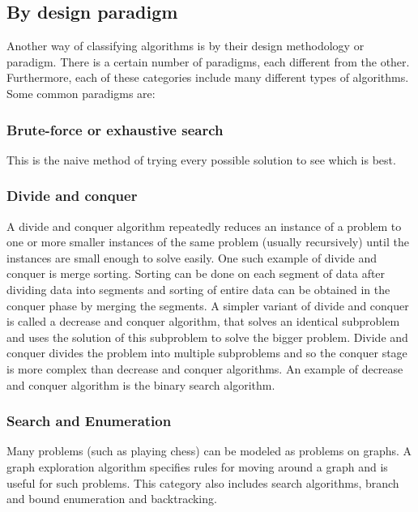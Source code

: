 \documentclass[12pt,a4paper]{book}
\begin{document}
\subsection{By design paradigm}
Another way of classifying algorithms is by their design methodology or paradigm. There is a certain number of paradigms, each different from the other. Furthermore, each of these categories include many different types of algorithms. Some common paradigms are:
\subsubsection{Brute-force or exhaustive search}
This is the naive method of trying every possible solution to see which is best.
\subsubsection{Divide and conquer}
A divide and conquer algorithm repeatedly reduces an instance of a problem to one or more smaller instances of the same problem (usually recursively) until the instances are small enough to solve easily. One such example of divide and conquer is merge sorting. Sorting can be done on each segment of data after dividing data into segments and sorting of entire data can be obtained in the conquer phase by merging the segments. A simpler variant of divide and conquer is called a decrease and conquer algorithm, that solves an identical subproblem and uses the solution of this subproblem to solve the bigger problem. Divide and conquer divides the problem into multiple subproblems and so the conquer stage is more complex than decrease and conquer algorithms. An example of decrease and conquer algorithm is the binary search algorithm.
\subsubsection{Search and Enumeration}
Many problems (such as playing chess) can be modeled as problems on graphs. A graph exploration algorithm specifies rules for moving around a graph and is useful for such problems. This category also includes search algorithms, branch and bound enumeration and backtracking.
\end{document}
